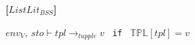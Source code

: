 {\textbf{[$ListLit_{BSS}$]}\\
\begin{center}
	\begin{math}
	env_V,\ sto \vdash tpl \rightarrow_{tupple} v
	\end{math}
	\texttt{ if } $\mathbb{TPL}[tpl] = v$
\end{center}






}
